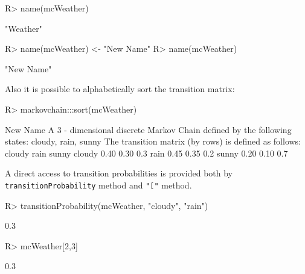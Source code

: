 \documentclass[article,nojss]{jss}
\begin{document}
\begin{CodeChunk}

\begin{CodeInput}
R> name(mcWeather)
\end{CodeInput}

\begin{CodeOutput}
[1] "Weather"
\end{CodeOutput}

\begin{CodeInput}
R> name(mcWeather) <- "New Name"
R> name(mcWeather)
\end{CodeInput}

\begin{CodeOutput}
[1] "New Name"
\end{CodeOutput}
\end{CodeChunk}

Also it is possible to alphabetically sort the transition matrix:

\begin{CodeChunk}

\begin{CodeInput}
R> markovchain:::sort(mcWeather)
\end{CodeInput}

\begin{CodeOutput}
New Name 
 A  3 - dimensional discrete Markov Chain defined by the following states: 
 cloudy, rain, sunny 
 The transition matrix  (by rows)  is defined as follows: 
       cloudy rain sunny
cloudy   0.40 0.30   0.3
rain     0.45 0.35   0.2
sunny    0.20 0.10   0.7
\end{CodeOutput}
\end{CodeChunk}

A direct access to transition probabilities is provided both by \texttt{transitionProbability} method and \texttt{"{[}"} method.

\begin{CodeChunk}

\begin{CodeInput}
R> transitionProbability(mcWeather, "cloudy", "rain")
\end{CodeInput}

\begin{CodeOutput}
[1] 0.3
\end{CodeOutput}

\begin{CodeInput}
R> mcWeather[2,3]
\end{CodeInput}

\begin{CodeOutput}
[1] 0.3
\end{CodeOutput}
\end{CodeChunk}
\end{document}
